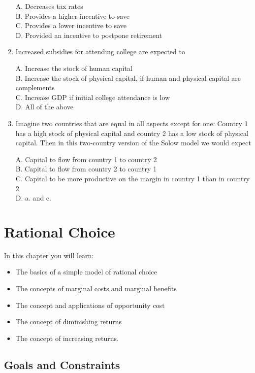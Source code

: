 \documentclass[
]{book}
\providecommand{\tightlist}{%
  \setlength{\itemsep}{0pt}\setlength{\parskip}{0pt}}
\begin{document}
\begin{enumerate}
  A. Decreases tax rates\\
  B. Provides a higher incentive to save\\
  C. Provides a lower incentive to save\\
  D. Provided an incentive to postpone retirement
\item
  Increased subsidies for attending college are expected to

  A. Increase the stock of human capital\\
  B. Increase the stock of physical capital, if human and physical capital are complements\\
  C. Increase GDP if initial college attendance is low\\
  D. All of the above
\item
  Imagine two countries that are equal in all aspects except for one: Country 1 has a high stock of physical capital and country 2 has a low stock of physical capital. Then in this two-country version of the Solow model we would expect

  A. Capital to flow from country 1 to country 2\\
  B. Capital to flow from country 2 to country 1\\
  C. Capital to be more productive on the margin in country 1 than in country 2\\
  D. a. and c.~
\end{enumerate}

\hypertarget{rational-choice}{%
\chapter{Rational Choice}\label{rational-choice}}

In this chapter you will learn:

\begin{itemize}
\tightlist
\item
  The basics of a simple model of rational choice
\item
  The concepts of marginal costs and marginal benefits
\item
  The concept and applications of opportunity cost
\item
  The concept of diminishing returns
\item
  The concept of increasing returns.
\end{itemize}

\hypertarget{goals-and-constraints}{%
\section{Goals and Constraints}\label{goals-and-constraints}}
\end{document}
